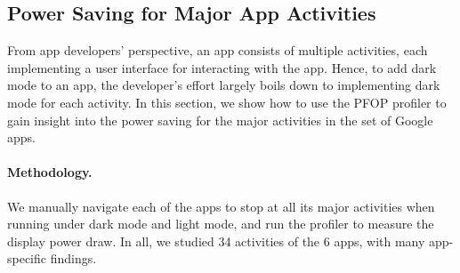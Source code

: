 \subsection{Power Saving for Major App Activities}
\label{subsec:activities}




From app developers' perspective, an app consists of multiple
activities, each implementing a user interface for interacting
with the app. Hence, to add dark mode to an app, the developer's
effort largely boils down to implementing dark mode for each
activity. In this section, we show how to use the PFOP profiler to
gain insight into the power saving for the major activities in the set of Google
apps.

\paragraph{Methodology.}
We manually navigate each of the apps to stop at all its major
activities when running under dark mode and light mode, and run
the \name profiler to measure the display power draw.
In all, we studied 34 activities of the 6 apps, with
many app-specific findings.

